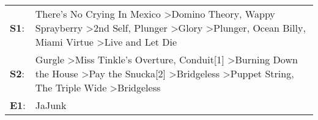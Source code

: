 \begin{supertabular}{p{0.03\textwidth}p{0.92\textwidth}}
 \textbf{S1}:  &  There's No Crying In Mexico\textsuperscript{} \textgreater \enspace Domino Theory\textsuperscript{}, \enspace Wappy Sprayberry\textsuperscript{} \textgreater \enspace 2nd Self\textsuperscript{}, \enspace Plunger\textsuperscript{} \textgreater \enspace Glory\textsuperscript{} \textgreater \enspace Plunger\textsuperscript{}, \enspace Ocean Billy\textsuperscript{}, \enspace Miami Virtue\textsuperscript{} \textgreater \enspace Live and Let Die\textsuperscript{}  \enspace  \\
 \textbf{S2}:  &                Gurgle\textsuperscript{} \textgreater \enspace Miss Tinkle's Overture\textsuperscript{}, \enspace Conduit[1]\textsuperscript{} \textgreater \enspace Burning Down the House\textsuperscript{} \textgreater \enspace Pay the Snucka[2]\textsuperscript{} \textgreater \enspace Bridgeless\textsuperscript{} \textgreater \enspace Puppet String\textsuperscript{}, \enspace The Triple Wide\textsuperscript{} \textgreater \enspace Bridgeless\textsuperscript{}  \enspace  \\
 \textbf{E1}:  &                                                                                                                                                                                                                                                                                                                                                                                                                                                       JaJunk\textsuperscript{}  \enspace  \\
\end{supertabular}
